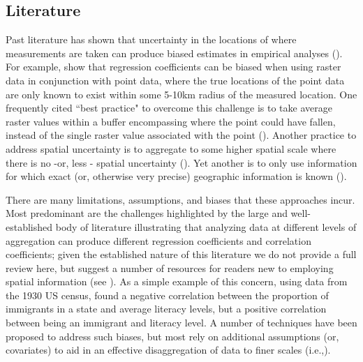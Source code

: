\subsection{Literature}

Past literature has shown that uncertainty in the locations of where measurements are taken can produce biased estimates in empirical analyses (\cite{perez-heydrich_guidelines_2013,rettie_overcoming_1999}). 
For example, \cite{perez-heydrich_guidelines_2013} show that regression coefficients can be biased when using raster data in conjunction with point data, where the true locations of the point data are only known to exist within some 5-10km radius of the measured location. 
One frequently cited ``best practice" to overcome this challenge is to take average raster values within a buffer encompassing where the point could have fallen, instead of the single raster value associated with the point (\cite{perez-heydrich_guidelines_2013, rettie_overcoming_1999}). 
Another practice to address spatial uncertainty is to aggregate to some higher spatial scale where there is no -or, less - spatial uncertainty (\cite{runfola_using_2014,giner_creating_2014,heydrich_guidelines_2013}). 
Yet another is to only use information for which exact (or, otherwise very precise) geographic information is known (\cite{runfola_migration_2016,dreher_aid_2015,runfola_what_2014}).
\par
There are many limitations, assumptions, and biases that these approaches incur.
Most predominant are the challenges highlighted by the large and well-established body of literature illustrating that analyzing data at different levels of aggregation can produce different regression coefficients and correlation coefficients; given the established nature of this literature we do not provide a full review here, but suggest a number of resources for readers new to employing spatial information (see \cite{clark_effects_1976, goodchild_models_2001, selvin_durkheims_1958, gotway_combining_2002, gehlke_certain_1934, cramer_efficient_1964}). 
As a simple example of this concern, using data from the 1930 US census, \cite{robinson_ecological_2009} found a negative correlation between the proportion of immigrants in a state and average literacy levels, but a positive correlation between being an immigrant and literacy level. 
A number of techniques have been proposed to address such biases, but most rely on additional assumptions (or, covariates) to aid in an effective disaggregation of data to finer scales (i.e.,\cite{gotway_combining_2002, zhu_combined_2004,oloughlin_can_2000,wong_modifiable_2004}).
